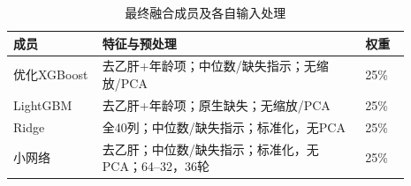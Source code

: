 \begin{table}[htbp]
\small
\setlength{\tabcolsep}{5pt}
\centering
\caption{最终融合成员及各自输入处理}
\label{tab:members}
\begin{tabular}{L{0.2\linewidth}L{0.59\linewidth}L{0.1\linewidth}}
\toprule
成员 & 特征与预处理 & 权重 \\
\midrule
优化XGBoost & 去乙肝+年龄项；中位数/缺失指示；无缩放/PCA & 25\% \\
LightGBM & 去乙肝+年龄项；原生缺失；无缩放/PCA & 25\% \\
Ridge & 全40列；中位数/缺失指示；标准化，无PCA & 25\% \\
小网络 & 去乙肝；中位数/缺失指示；标准化，无PCA；64--32，36轮 & 25\% \\
\bottomrule
\end{tabular}
\end{table}
